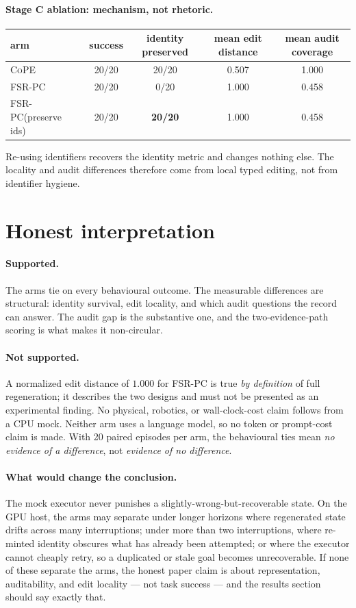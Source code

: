 \documentclass[11pt]{article}
\newcommand{\cope}{\textsc{CoPE}}
\newcommand{\fsrpc}{\textsc{FSR-PC}}
\begin{document}
\paragraph{Stage C ablation: mechanism, not rhetoric.}
\begin{center}
\begin{tabular}{@{}lcccc@{}}
\toprule
arm & success & identity preserved & mean edit distance & mean audit coverage\\
\midrule
\cope{} & 20/20 & 20/20 & 0.507 & 1.000\\
\fsrpc{} & 20/20 & 0/20 & 1.000 & 0.458\\
\fsrpc{}(preserve ids) & 20/20 & \textbf{20/20} & 1.000 & 0.458\\
\bottomrule
\end{tabular}
\end{center}
Re-using identifiers recovers the identity metric and changes nothing else. The
locality and audit differences therefore come from local typed editing, not from
identifier hygiene.

\section{Honest interpretation}

\paragraph{Supported.}
The arms tie on every behavioural outcome. The measurable differences are
structural: identity survival, edit locality, and which audit questions the
record can answer. The audit gap is the substantive one, and the two-evidence-path
scoring is what makes it non-circular.

\paragraph{Not supported.}
A normalized edit distance of $1.000$ for \fsrpc{} is true \emph{by definition}
of full regeneration; it describes the two designs and must not be presented as
an experimental finding. No physical, robotics, or wall-clock-cost claim
follows from a CPU mock. Neither arm uses a language model, so no token or
prompt-cost claim is made. With 20 paired episodes per arm, the behavioural ties
mean \emph{no evidence of a difference}, not \emph{evidence of no difference}.

\paragraph{What would change the conclusion.}
The mock executor never punishes a slightly-wrong-but-recoverable state. On the
GPU host, the arms may separate under longer horizons where regenerated state
drifts across many interruptions; under more than two interruptions, where
re-minted identity obscures what has already been attempted; or where the
executor cannot cheaply retry, so a duplicated or stale goal becomes
unrecoverable. If none of these separate the arms, the honest paper claim is
about representation, auditability, and edit locality --- not task success ---
and the results section should say exactly that.
\end{document}
